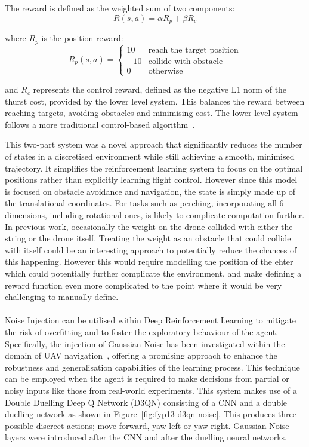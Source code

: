 The reward is defined as the weighted sum of two components:
\[R(s, a) = \alpha R_{p} + \beta R_{c}\]

where $R_{p}$ is the position reward:
\[
R_{p}(s, a) = 
\begin{cases} 
10 & \text{reach the target position} \\
-10 & \text{collide with obstacle} \\
0 & \text{otherwise}
\end{cases}
\]

and $R_{c}$ represents the control reward, defined as the negative L1 norm of the thurst cost, provided by the lower level system.
This balances the reward between reaching targets, avoiding obstacles and minimising cost.
The lower-level system follows a more traditional control-based algorithm~\cite{fyp12-waypoint-nav2}.

This two-part system was a novel approach that significantly reduces the number of states in a discretised environment while still achieving a smooth, minimised trajectory.
It simplifies the reinforcement learning system to focus on the optimal positions rather than explicitly learning flight control.
However since this model is focused on obstacle avoidance and navigation, the state is simply made up of the translational coordinates.
For tasks such as perching, incorporating all 6 dimensions, including rotational ones, is likely to complicate computation further.
In previous work, occasionally the weight on the drone collided with either the string or the drone itself.
Treating the weight as an obstacle that could collide with itself could be an interesting approach to potentially reduce the chances of this happening.
However this would require modelling the position of the ehter which could potentially further complicate the environment, and make defining a reward function even more complicated to the point where it would be very challenging to manually define. \\\\

Noise Injection can be utilised within Deep Reinforcement Learning to mitigate the risk of overfitting and to foster the exploratory behaviour of the agent.
Specifically, the injection of Gaussian Noise has been investigated within the domain of UAV navigation~\cite{fyp13-noise-injection}, offering a promising approach to enhance the robustness and generalisation capabilities of the learning process.
This technique can be employed when the agent is required to make decisions from partial or noisy inputs like those from real-world experiments.
This system makes use of a Double Duelling Deep Q Network (D3QN) consisting of a CNN and a double duelling network as shown in Figure~\ref{fig:fyp13-d3qn-noise}.
This produces three possible discreet actions; move forward, yaw left or yaw right.
Gaussian Noise layers were introduced after the CNN and after the duelling neural networks.


